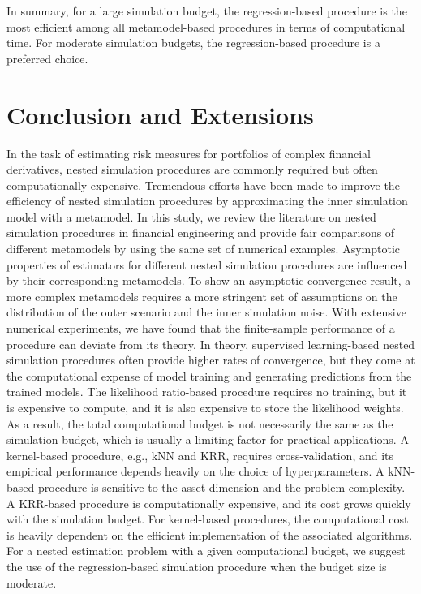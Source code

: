 In summary, for a large simulation budget, the regression-based procedure is the most efficient among all metamodel-based procedures in terms of computational time.
For moderate simulation budgets, the regression-based procedure is a preferred choice.

\section{Conclusion and Extensions} \label{sec1:conclusion}
In the task of estimating risk measures for portfolios of complex financial derivatives, nested simulation procedures are commonly required but often computationally expensive. 
Tremendous efforts have been made to improve the efficiency of nested simulation procedures by approximating the inner simulation model with a metamodel. 
In this study, we review the literature on nested simulation procedures in financial engineering and provide fair comparisons of different metamodels by using the same set of numerical examples. 
Asymptotic properties of estimators for different nested simulation procedures are influenced by their corresponding metamodels.
To show an asymptotic convergence result, a more complex metamodels requires a more stringent set of assumptions on the distribution of the outer scenario and the inner simulation noise.
With extensive numerical experiments, we have found that the finite-sample performance of a procedure can deviate from its theory. 
In theory, supervised learning-based nested simulation procedures often provide higher rates of convergence, but they come at the computational expense of model training and generating predictions from the trained models. 
The likelihood ratio-based procedure requires no training, but it is expensive to compute, and it is also expensive to store the likelihood weights.
As a result, the total computational budget is not necessarily the same as the simulation budget, which is usually a limiting factor for practical applications.
A kernel-based procedure, e.g., kNN and KRR, requires cross-validation, and its empirical performance depends heavily on the choice of hyperparameters.
A kNN-based procedure is sensitive to the asset dimension and the problem complexity.
A KRR-based procedure is computationally expensive, and its cost grows quickly with the simulation budget.
For kernel-based procedures, the computational cost is heavily dependent on the efficient implementation of the associated algorithms.
For a nested estimation problem with a given computational budget, we suggest the use of the regression-based simulation procedure when the budget size is moderate. 

